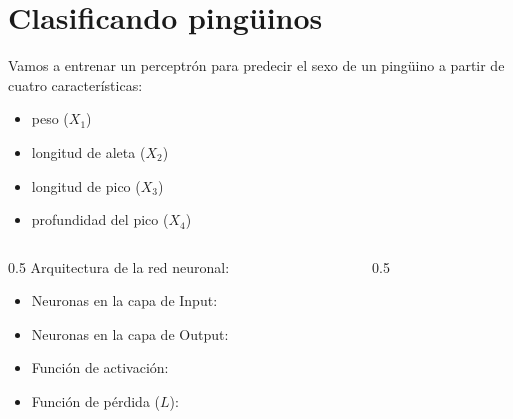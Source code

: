\documentclass[aspectratio=169, usenames,dvipsnames]{beamer}
\begin{document}
\section{Clasificando pingüinos}

\begin{frame}
    Vamos a entrenar un perceptrón para predecir el sexo de un pingüino a partir de cuatro características:
    \begin{itemize}
        \item peso ($X_1$)
        \item longitud de aleta ($X_2$)
        \item longitud de pico ($X_3$)
        \item profundidad del pico ($X_4$)
    \end{itemize}

    \vspace{0.5cm}
    \pause
    \begin{columns}
        \begin{column}{0.5\textwidth}
        \blacktriangleright Arquitectura de la red neuronal:
        \begin{itemize}
            \item Neuronas en la capa de Input: 
            \item Neuronas en la capa de Output: 
            \item Función de activación: 
            \item Función de pérdida ($L$): 
        \end{itemize}            
        \end{column}
        \begin{column}{0.5\textwidth}
        \end{column}
    \end{columns}
\end{frame}
\end{document}
